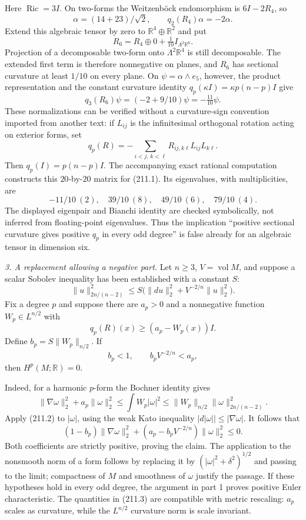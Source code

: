 \documentclass[11pt,a4paper]{article}
\newcommand{\R}{\mathbb{R}}
\begin{document}
Here $\operatorname{Ric}=3I$. On two-forms the Weitzenb\"ock endomorphism is
$6I-2R_4$, so
\[
 \alpha=(14+23)/\sqrt2,\qquad q_2(R_4)\alpha=-2\alpha.
\]
Extend this algebraic tensor by zero to $\R^4\oplus\R^2$ and put
\[
 R_6=R_4\oplus0+\tfrac1{10}I_{\Lambda^2\R^6}.
\]
Projection of a decomposable two-form onto $\Lambda^2\R^4$ is still
decomposable. The extended first term is therefore nonnegative on planes,
and $R_6$ has sectional curvature at least $1/10$ on every plane. On
$\psi=\alpha\wedge e_5$, however, the product representation and the constant
curvature identity $q_p(\kappa I)=\kappa p(n-p)I$ give
\[
 q_3(R_6)\psi=(-2+9/10)\psi=-\tfrac{11}{10}\psi.                 \tag{211.1}
\]
These normalizations can be verified without a curvature-sign convention
imported from another text: if $L_{ij}$ is the infinitesimal orthogonal
rotation acting on exterior forms, set
\[
 q_p(R)=-\sum_{i<j,\,k<\ell}R_{ij,k\ell}L_{ij}L_{k\ell}.
\]
Then $q_p(I)=p(n-p)I$. The accompanying exact rational computation constructs
this $20$-by-$20$ matrix for (211.1). Its eigenvalues, with multiplicities, are
\[
 -11/10\ (2),\quad39/10\ (8),\quad49/10\ (6),\quad79/10\ (4).
\]
The displayed eigenpair and Bianchi identity are checked symbolically, not
inferred from floating-point eigenvalues. Thus the implication
``positive sectional curvature gives positive $q_p$ in every odd degree''
is false already for an algebraic tensor in dimension six.

\textit{3. A replacement allowing a negative part.}
Let $n\ge3$, $V=\operatorname{vol}M$, and suppose a scalar Sobolev inequality
has been established with a constant $S$:
\[
 \|u\|_{2n/(n-2)}^2\le S\bigl(\|du\|_2^2+V^{-2/n}\|u\|_2^2\bigr).
                                                               \tag{211.2}
\]
Fix a degree $p$ and suppose there are $a_p>0$ and a nonnegative function
$W_p\in L^{n/2}$ with
\[
 q_p(R)(x)\ge(a_p-W_p(x))I.
\]
Define $b_p=S\|W_p\|_{n/2}$. If
\[
 b_p<1,\qquad b_p V^{-2/n}<a_p,                                 \tag{211.3}
\]
then $H^p(M;\R)=0$.

Indeed, for a harmonic $p$-form the Bochner identity gives
\[
 \|\nabla\omega\|_2^2+a_p\|\omega\|_2^2
 \le\int W_p|\omega|^2
 \le\|W_p\|_{n/2}\|\omega\|_{2n/(n-2)}^2.
\]
Apply (211.2) to $|\omega|$, using the weak Kato inequality
$|d|\omega||\le|\nabla\omega|$. It follows that
\[
 (1-b_p)\|\nabla\omega\|_2^2+
 (a_p-b_pV^{-2/n})\|\omega\|_2^2\le0.
\]
Both coefficients are strictly positive, proving the claim. The application
to the nonsmooth norm of a form follows by replacing it by
$(|\omega|^2+\delta^2)^{1/2}$ and passing to the limit; compactness of $M$
and smoothness of $\omega$ justify the passage. If these hypotheses hold in
every odd degree, the argument in part 1 proves positive Euler characteristic.
The quantities in (211.3) are compatible with metric rescaling: $a_p$ scales
as curvature, while the $L^{n/2}$ curvature norm is scale invariant.
\end{document}
